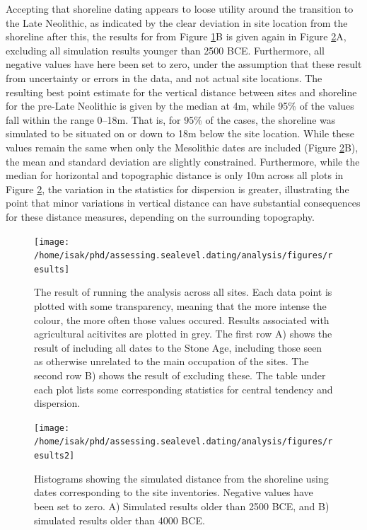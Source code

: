 \documentclass[
]{article}
\begin{document}
Accepting that shoreline dating appears to loose utility around the transition to the Late Neolithic, as indicated by the clear deviation in site location from the shoreline after this, the results for from Figure \ref{fig:results}B is given again in Figure \ref{fig:results2}A, excluding all simulation results younger than 2500 BCE. Furthermore, all negative values have here been set to zero, under the assumption that these result from uncertainty or errors in the data, and not actual site locations. The resulting best point estimate for the vertical distance between sites and shoreline for the pre-Late Neolithic is given by the median at 4m, while 95\% of the values fall within the range 0--18m. That is, for 95\% of the cases, the shoreline was simulated to be situated on or down to 18m below the site location. While these values remain the same when only the Mesolithic dates are included (Figure \ref{fig:results2}B), the mean and standard deviation are slightly constrained. Furthermore, while the median for horizontal and topographic distance is only 10m across all plots in Figure \ref{fig:results2}, the variation in the statistics for dispersion is greater, illustrating the point that minor variations in vertical distance can have substantial consequences for these distance measures, depending on the surrounding topography.

\begin{figure}

{\centering \texttt{[image: /home/isak/phd/assessing.sealevel.dating/analysis/figures/results]} 

}

\caption{The result of running the analysis across all sites. Each data point is plotted with some transparency, meaning that the more intense the colour, the more often those values occured. Results associated with agricultural acitivites are plotted in grey. The first row A) shows the result of including all dates to the Stone Age, including those seen as otherwise  unrelated to the main occupation of the sites. The second row B) shows the result of excluding these. The table under each plot lists some corresponding statistics for central tendency and dispersion.}\label{fig:results}
\end{figure}

\begin{figure}

{\centering \texttt{[image: /home/isak/phd/assessing.sealevel.dating/analysis/figures/results2]} 

}

\caption{Histograms showing the simulated distance from the shoreline using dates corresponding to the site inventories. Negative values have been set to zero. A) Simulated results older than 2500 BCE, and B) simulated results older than 4000 BCE.}\label{fig:results2}
\end{figure}
\end{document}
